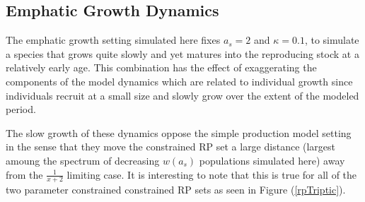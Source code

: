 %


\subsection{Emphatic Growth Dynamics}

%
The emphatic growth setting simulated here fixes $a_s=2$ and $\kappa=0.1$, to 
simulate a species that grows quite slowly and yet matures into the 
reproducing  stock at a relatively early age. This combination has the effect 
of exaggerating the components of the model dynamics which are related to 
individual growth since individuals recruit at a small size and slowly 
grow over the extent of the modeled period. 

%
The slow growth of these dynamics oppose the simple production model setting 
in the sense that they move the constrained RP set a large distance (largest 
amoung the spectrum of decreasing $w(a_s)$ populations simulated here) 
away from the $\frac{1}{x+2}$ limiting case. It is interesting to note that 
this is true for all of the two parameter constrained constrained RP sets as 
seen in Figure (\ref{rpTriptic}). 


